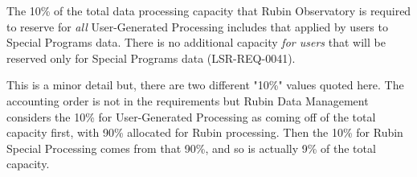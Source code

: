 The 10\% of the total data processing capacity that Rubin Observatory is 
required to reserve for \emph{all} User-Generated Processing includes that 
applied by users to Special Programs data.
There is no additional capacity {\it for users} that will be reserved only for Special 
Programs data (LSR-REQ-0041).

This is a minor detail but, there are two different "10\%" values quoted here.
The accounting order is not in the requirements but Rubin Data Management considers
the 10\% for User-Generated Processing as coming off of the total capacity first,
with 90\% allocated for Rubin processing.
Then the 10\% for Rubin Special Processing comes from that 90\%,
and so is actually 9\% of the total capacity.
